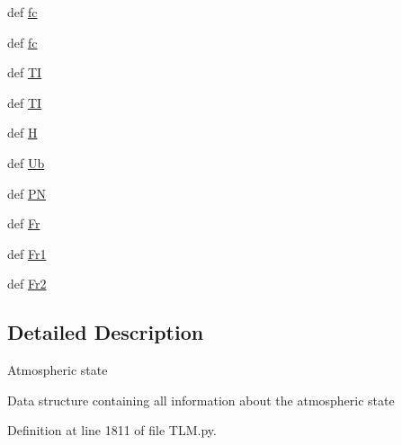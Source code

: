 \begin{DoxyCompactItemize}
\item 
def \hyperlink{classDropbox_1_1ThreeLayerModel_1_1TLM_1_1ABL_a819a68a8fb14d7ad169d7d4ab56cb2bd}{fc}
\item 
def \hyperlink{classDropbox_1_1ThreeLayerModel_1_1TLM_1_1ABL_a819a68a8fb14d7ad169d7d4ab56cb2bd}{fc}
\item 
def \hyperlink{classDropbox_1_1ThreeLayerModel_1_1TLM_1_1ABL_a518b27321444a05a49c6d18c0c05821b}{T\+I}
\item 
def \hyperlink{classDropbox_1_1ThreeLayerModel_1_1TLM_1_1ABL_a518b27321444a05a49c6d18c0c05821b}{T\+I}
\item 
def \hyperlink{classDropbox_1_1ThreeLayerModel_1_1TLM_1_1ABL_a76b83214dcfe9deb636bdac6cdf20873}{H}
\item 
def \hyperlink{classDropbox_1_1ThreeLayerModel_1_1TLM_1_1ABL_a8cf1ae9a7da9b8950382544af68876c3}{Ub}
\item 
def \hyperlink{classDropbox_1_1ThreeLayerModel_1_1TLM_1_1ABL_a6d89e1acd1b13605a4f51ed0fc768ed6}{P\+N}
\item 
def \hyperlink{classDropbox_1_1ThreeLayerModel_1_1TLM_1_1ABL_ad2f1c9d353427bd5665f1a6bd65a1edc}{Fr}
\item 
def \hyperlink{classDropbox_1_1ThreeLayerModel_1_1TLM_1_1ABL_ab35c0aef30d1696472255363faf76309}{Fr1}
\item 
def \hyperlink{classDropbox_1_1ThreeLayerModel_1_1TLM_1_1ABL_a1271b7753225b51e780792fbec8f3fea}{Fr2}
\end{DoxyCompactItemize}


\subsection{Detailed Description}
\begin{DoxyVerb}Atmospheric state

Data structure containing all information about the atmospheric state
\end{DoxyVerb}
 

Definition at line 1811 of file T\+L\+M.\+py.



